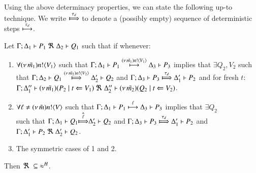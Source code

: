 {Using the above determinacy properties, we can state the following up-to technique.
We write $\Hby{\dtau}$ to denote a (possibly empty) sequence of deterministic steps 
$\stackrel{\tau_{d}}{\longmapsto}$.


\begin{lemma}%
	\label{lem:up_to_deterministic_transition}
	Let $\Gamma; \Delta_1 \vdash P_1 \ \Re\  \Delta_2 \vdash Q_1$ such
	that if whenever:
%
	\begin{enumerate}[1.]
		\item	$\forall (\nu\, \tilde{m_1}) n ! \langle V_1 \rangle$ such that
			$
				\Gamma; \Delta_1 \vdash P_1 \stackrel{(\nu\, \tilde{m_1}) n ! \langle V_1 \rangle}{\longmapsto} \Delta_3 \vdash P_3
			$
			implies that $\exists Q_2, V_2$ such that
			$
				\horel{\Gamma}{\Delta_2}{Q_1}{\Hby{\news{\tilde{m_2}} \bactout{n}{V_2}}}{\Delta_2'}{Q_2}
			$
			and
			$
				\horel{\Gamma}{\Delta_3}{P_3}{\Hby{\dtau}}{\Delta_1'}{P_2}
			$
			and for fresh $t$:\\
			$
				\Gamma; \Delta_1'' \vdash (\nu\, \tilde{m_1})(P_2 \;|\; t \Leftarrow V_1) \ \Re\  \Delta_2'' \vdash{(\nu\, \tilde{m_2})(Q_2 \;|\;t \Leftarrow V_2)}
			$.
%
		\item	$\forall \ell \not= (\nu\, \tilde{m}) n ! \langle V \rangle$ such that
			$
				\Gamma; \Delta_1 \vdash P_1 \stackrel{\ell}{\longmapsto} \Delta_3 \vdash P_3
			$
			implies that $\exists Q_2$  \\ such that 
			$
				\horel{\Gamma}{\Delta_1}{Q_1}{\hat{\Hby{\ell}}}{\Delta_2'}{Q_2}
			$
			and
			$
				\horel{\Gamma}{\Delta_3}{P_3}{\Hby{\dtau}}{\Delta_1'}{P_2}
			$
			and
			$\Gamma; \Delta_1' \vdash P_2 \ \Re\  \Delta_2' \vdash Q_2$.

		\item	The symmetric cases of 1 and 2.
	\end{enumerate}
	Then $\Re\ \subseteq\ \approx^H$.
\end{lemma}


}
